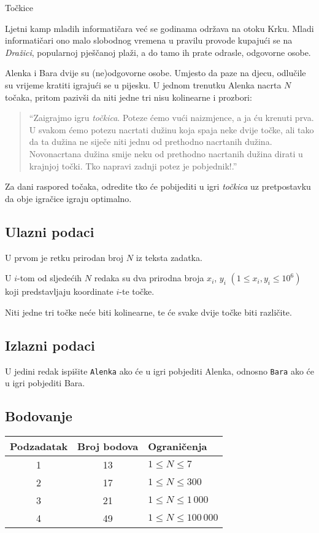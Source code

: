 \begin{statement}[
  problempoints=100,
  timelimit=1 sekunda,
  memorylimit=512 MiB,
]{Točkice}

Ljetni kamp mladih informatičara već se godinama održava na otoku Krku.  Mladi
informatičari ono malo slobodnog vremena u pravilu provode kupajući se na
\textit{Dražici}, popularnoj pješčanoj plaži, a do tamo ih prate odrasle,
odgovorne osobe.

Alenka i Bara dvije su (ne)odgovorne osobe. Umjesto da paze na djecu, odlučile
su vrijeme kratiti igrajući se u pijesku. U jednom trenutku Alenka nacrta $N$
točaka, pritom pazivši da niti jedne tri nisu kolinearne i prozbori:
\begin{quote}
``Zaigrajmo igru \textit{točkica}. Poteze ćemo vući naizmjence, a ja ću krenuti
  prva. U svakom ćemo potezu nacrtati dužinu koja spaja neke dvije točke, ali
  tako da ta dužina ne siječe niti jednu od prethodno nacrtanih dužina.
  Novonacrtana dužina smije neku od prethodno nacrtanih dužina dirati u
  krajnjoj točki. Tko napravi zadnji potez je pobjednik!.''
\end{quote}
Za dani raspored točaka, odredite tko će pobijediti u igri \textit{točkica} uz
pretpostavku da obje igračice igraju optimalno.

\subsection*{Ulazni podaci}
U prvom je retku prirodan broj $N$ iz teksta zadatka.

U $i$-tom od sljedećih $N$ redaka su dva prirodna broja $x_i$, $y_i$ $(1 \leq
x_i, y_i \leq 10^6)$ koji predstavljaju koordinate $i$-te točke.

Niti jedne tri točke neće biti kolinearne, te će svake dvije točke biti različite.
\subsection*{Izlazni podaci}
U jedini redak ispišite \texttt{Alenka} ako će u igri pobjediti Alenka,
odnosno \texttt{Bara} ako će u igri pobjediti Bara.

\subsection*{Bodovanje}
{\renewcommand{\arraystretch}{1.4}
  \setlength{\tabcolsep}{6pt}
  \begin{tabular}{ccl}
 Podzadatak & Broj bodova & Ograničenja \\ \midrule
  1 & 13 & $1 \le N \le 7$\\
  2 & 17 & $1 \le N \le 300$\\
  3 & 21 & $1 \le N \le 1\,000$\\
  4 & 49 & $1 \le N \le 100\,000$\\
\end{tabular}}


\end{statement}
